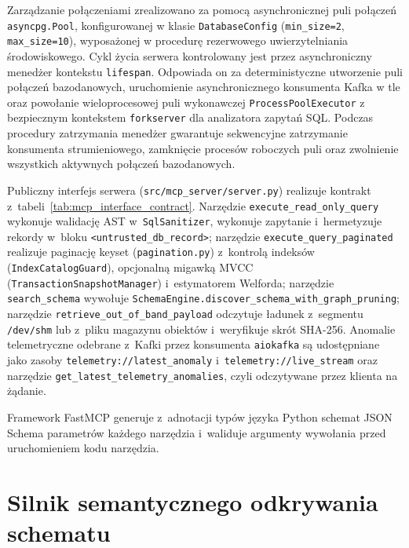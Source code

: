 Zarządzanie połączeniami zrealizowano za pomocą asynchronicznej puli połączeń \texttt{asyncpg.Pool}, konfigurowanej w klasie \texttt{DatabaseConfig} (\texttt{min\_size=2}, \texttt{max\_size=10}), wyposażonej w procedurę rezerwowego uwierzytelniania środowiskowego. Cykl życia serwera kontrolowany jest przez asynchroniczny menedżer kontekstu \texttt{lifespan}. Odpowiada on za deterministyczne utworzenie puli połączeń bazodanowych, uruchomienie asynchronicznego konsumenta Kafka w tle oraz powołanie wieloprocesowej puli wykonawczej \texttt{ProcessPoolExecutor} z bezpiecznym kontekstem \texttt{forkserver} dla analizatora zapytań SQL. Podczas procedury zatrzymania menedżer gwarantuje sekwencyjne zatrzymanie konsumenta strumieniowego, zamknięcie procesów roboczych puli oraz zwolnienie wszystkich aktywnych połączeń bazodanowych.

Publiczny interfejs serwera (\texttt{src/mcp\_server/server.py}) realizuje kontrakt z~tabeli~\ref{tab:mcp_interface_contract}. Narzędzie \texttt{execute\_read\_only\_query} wykonuje walidację AST w~\texttt{SqlSanitizer}, wykonuje zapytanie i~hermetyzuje rekordy w~bloku \texttt{<untrusted\_db\_record>}; narzędzie \texttt{execute\_query\_paginated} realizuje paginację keyset (\texttt{pagination.py}) z~kontrolą indeksów (\texttt{IndexCatalogGuard}), opcjonalną migawką MVCC (\texttt{TransactionSnapshotManager}) i~estymatorem Welforda; narzędzie \texttt{search\_schema} wywołuje \texttt{SchemaEngine.}\allowbreak\texttt{discover\_schema\_}\allowbreak\texttt{with\_graph\_pruning}; narzędzie \texttt{retrieve\_out\_of\_band\_payload} odczytuje ładunek z~segmentu \texttt{/dev/shm} lub z~pliku magazynu obiektów i~weryfikuje skrót SHA-256. Anomalie telemetryczne odebrane z~Kafki przez konsumenta \texttt{aiokafka} są udostępniane jako zasoby \texttt{telemetry://latest\_anomaly} i~\texttt{telemetry://live\_stream} oraz narzędzie \texttt{get\_latest\_telemetry\_anomalies}, czyli odczytywane przez klienta na żądanie.

Framework FastMCP generuje z~adnotacji typów języka Python schemat JSON Schema parametrów każdego narzędzia i~waliduje argumenty wywołania przed uruchomieniem kodu narzędzia.


\section{Silnik semantycznego odkrywania schematu}
\label{sec:schema_discovery}

